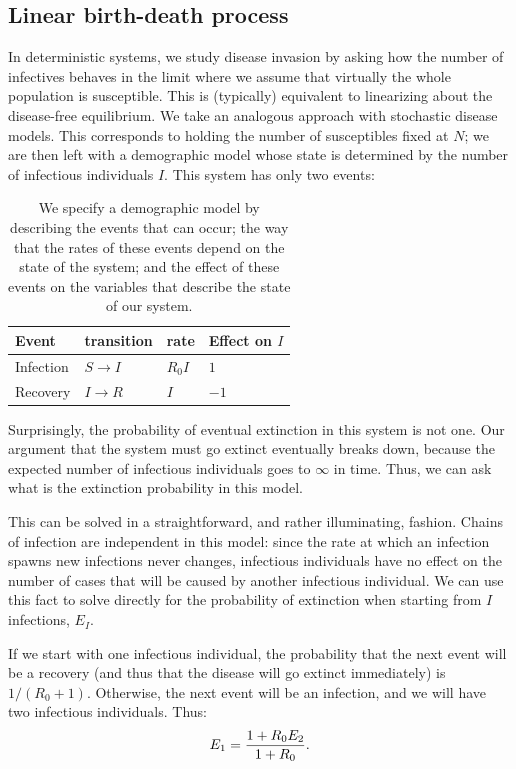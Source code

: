 \documentclass{amsproc}
\theoremstyle{definition}
\theoremstyle{remark}
\numberwithin{equation}{section}
\begin{document}
\subsection{Linear birth-death process} 

In deterministic systems, we study disease invasion by asking how the number of infectives behaves in the limit where we assume that virtually the whole population is susceptible.
This is (typically) equivalent to linearizing about the disease-free equilibrium.
We take an analogous approach with stochastic disease models.
This corresponds to holding the number of susceptibles fixed at $N$; we are then left with a demographic model whose state is determined by the number of infectious individuals $I$. 
This system has only two events: 
\begin{table}
\begin{center}\begin{tabular}{llll}
   {\bf Event} & {\bf transition} &{\bf rate} &{\bf Effect on $I$}\\
   \hline
   Infection &$S \to I$  &$R_0 I$ & $1$\\
   Recovery & $I \to R$ & $I$ & $-1$
\end{tabular}\end{center}
\caption[Rates table]{
%
	We specify a demographic model by describing the events that can occur; the way that the rates of these events depend on the state of the system; and the effect of these events on the variables that describe the state of our system.
%
}
\end{table}

Surprisingly, the probability of eventual extinction in this system is not one.  
Our argument that the system must go extinct eventually breaks down, because the expected number of infectious individuals goes to $\infty$ in time.  
Thus, we can ask what is the extinction probability in this model.

This can be solved in a straightforward, and rather illuminating, fashion.
Chains of infection are independent in this model: since the rate at which an infection spawns new infections never changes, infectious individuals have no effect on the number of cases that will be caused by another infectious individual. 
We can use this fact to solve directly for the probability of extinction when starting from $I$ infections, $E_I$. 

If we start with one infectious individual, the probability that the next event will be a recovery (and thus that the disease will go extinct immediately) is $1/(R_0+1)$.  Otherwise, the next event will be an infection, and we will have two infectious individuals.
Thus:
\begin{equation}
	E_1 = \frac{1+R_0 E_2}{1+R_0}.
\end{equation}
\end{document}
